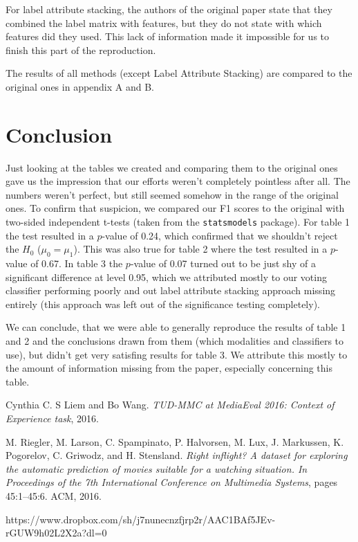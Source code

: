 \documentclass[sigconf]{acmart}
\begin{document}
For label attribute stacking, the authors of the original paper state that they combined the label matrix with features, but they do not state with which features did they used. This lack of information made it impossible for us to finish this part of the reproduction.

The results of all methods (except Label Attribute Stacking) are compared to the original ones in appendix A and B.

\section{Conclusion}
Just looking at the tables we created and comparing them to the original ones gave us the impression that our efforts weren't completely pointless after all. The numbers weren't perfect, but still seemed somehow in the range of the original ones. To confirm that suspicion, we compared our F1 scores to the original with two-sided independent t-tests (taken from the \texttt{statsmodels} package). For table 1 the test resulted in a $p$-value of 0.24, which confirmed that we shouldn't reject the $H_0$ ($\mu_0 = \mu_1$). This was also true for table 2 where the test resulted in a $p$-value of 0.67. In table 3 the $p$-value of 0.07 turned out to be just shy of a significant difference at level 0.95, which we attributed mostly to our voting classifier performing poorly and out label attribute stacking approach missing entirely (this approach was left out of the significance testing completely).

We can conclude, that we were able to generally reproduce the results of table 1 and 2 and the conclusions drawn from them (which modalities and classifiers to use), but didn't get very satisfing results for table 3. We attribute this mostly to the amount of information missing from the paper, especially concerning this table.

\begin{thebibliography}{2}

   Cynthia C. S Liem and Bo Wang. \textit{TUD-MMC at MediaEval 2016: Context of Experience task}, 2016.

   M. Riegler, M. Larson, C. Spampinato, P. Halvorsen, M. Lux, J. Markussen, K. Pogorelov, C. Griwodz, and H. Stensland. \textit{Right inflight? A dataset for exploring the automatic prediction of movies suitable for a watching situation. In Proceedings of the 7th International Conference on Multimedia Systems}, pages 45:1–45:6. ACM, 2016.

   https://www.dropbox.com/sh/j7nunecnzfjrp2r/AAC1BAf5JEv-rGUW9h02L2X2a?dl=0

\end{thebibliography}
\end{document}
